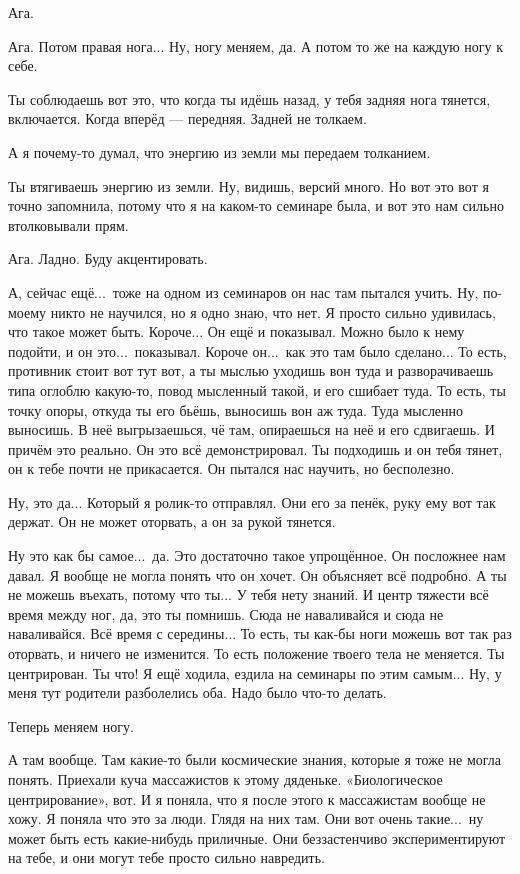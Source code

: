 \M
Ага.

\I
Ага. Потом правая нога... Ну, ногу меняем, да.
А потом то же на каждую ногу к себе.

\M
Ты соблюдаешь вот это, что когда ты идёшь назад, у тебя задняя нога тянется, включается.
Когда вперёд --- передняя.
Задней не толкаем.

\I
А я почему-то думал, что энергию из земли мы передаем толканием.

\M
Ты втягиваешь энергию из земли.
Ну, видишь, версий много.
Но вот это вот я точно запомнила, потому что я на каком-то семинаре была, и
вот это нам сильно втолковывали прям.

\I
Ага. Ладно. Буду акцентировать.

\M
А, сейчас ещё...\ тоже на одном из семинаров он нас там пытался учить.
Ну, по-моему никто не научился, но я одно знаю, что нет. Я просто сильно удивилась,
что такое может быть. Короче... Он ещё и показывал. Можно было к нему
подойти, и он это...\ показывал. Короче он...\ как это там было сделано...
То есть, противник стоит вот тут вот, а ты мыслью уходишь вон туда и разворачиваешь
типа оглоблю какую-то, повод мысленный такой, и его сшибает туда. То есть, ты точку опоры,
откуда ты его бьёшь, выносишь вон аж туда. Туда мысленно выносишь. В неё
выгрызаешься, чё там, опираешься на неё и его
сдвигаешь. И причём это реально. Он это всё демонстрировал.
Ты подходишь и он тебя тянет, он к тебе почти не прикасается.
Он пытался нас научить, но бесполезно.

\I
Ну, это да... Который я ролик-то отправлял. Они его за пенёк, руку ему вот так держат.
Он не может оторвать, а он за рукой тянется.

\M
Ну это как бы самое...\ да. Это достаточно такое упрощённое.
Он посложнее нам давал. Я вообще не могла понять
что он хочет. Он объясняет всё подробно. А ты не можешь въехать, потому что ты...
У тебя нету знаний. И центр тяжести всё время
между ног, да, это ты помнишь. Сюда не наваливайся
и сюда не наваливайся. Всё время с середины...
То есть, ты как-бы ноги можешь вот так {\csc раз} оторвать, и ничего не изменится.
То есть положение твоего тела не меняется.
Ты центрирован.
Ты что!
Я ещё ходила, ездила на семинары по этим самым...
Ну, у меня тут родители разболелись оба.
Надо было что-то делать.

\I
Теперь меняем ногу.

\M
А там вообще. Там какие-то были
космические знания, которые я тоже не могла понять. Приехали куча массажистов
к этому дяденьке. «Биологическое центрирование», вот. И я поняла, что я после этого к массажистам
вообще не хожу. Я поняла что это за люди. Глядя на них там.
Они вот очень такие...\ ну может
быть есть какие-нибудь приличные. Они беззастенчиво экспериментируют на тебе, и они могут тебе
просто сильно навредить.

